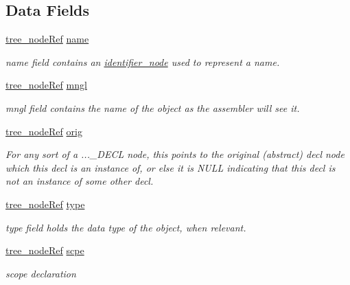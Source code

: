 \subsection*{Data Fields}
\begin{DoxyCompactItemize}
\item 
\hyperlink{tree__node_8hpp_a6ee377554d1c4871ad66a337eaa67fd5}{tree\+\_\+node\+Ref} \hyperlink{structdecl__node_a006b2ff345da98bd3c288526bfa633f4}{name}
\begin{DoxyCompactList}\small\item\em name field contains an \hyperlink{structidentifier__node}{identifier\+\_\+node} used to represent a name. \end{DoxyCompactList}\item 
\hyperlink{tree__node_8hpp_a6ee377554d1c4871ad66a337eaa67fd5}{tree\+\_\+node\+Ref} \hyperlink{structdecl__node_ae9845371426b7437237a5d9b4c23e5b4}{mngl}
\begin{DoxyCompactList}\small\item\em mngl field contains the name of the object as the assembler will see it. \end{DoxyCompactList}\item 
\hyperlink{tree__node_8hpp_a6ee377554d1c4871ad66a337eaa67fd5}{tree\+\_\+node\+Ref} \hyperlink{structdecl__node_ac29105ad772962c0ecba4977823370bf}{orig}
\begin{DoxyCompactList}\small\item\em For any sort of a ...\+\_\+\+D\+E\+CL node, this points to the original (abstract) decl node which this decl is an instance of, or else it is N\+U\+LL indicating that this decl is not an instance of some other decl. \end{DoxyCompactList}\item 
\hyperlink{tree__node_8hpp_a6ee377554d1c4871ad66a337eaa67fd5}{tree\+\_\+node\+Ref} \hyperlink{structdecl__node_a7f4982d034cf4e96b5c192060b6a3a1a}{type}
\begin{DoxyCompactList}\small\item\em type field holds the data type of the object, when relevant. \end{DoxyCompactList}\item 
\hyperlink{tree__node_8hpp_a6ee377554d1c4871ad66a337eaa67fd5}{tree\+\_\+node\+Ref} \hyperlink{structdecl__node_ac3e71763c580d5ee0b678e4a901a3766}{scpe}
\begin{DoxyCompactList}\small\item\em scope declaration \end{DoxyCompactList}\item 

\end{DoxyCompactItemize}
